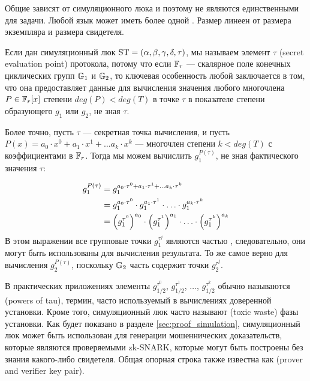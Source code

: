 Общие  зависят от симуляционного люка и поэтому не являются единственными для задачи. Любой язык может иметь более одной . Размер  линеен от размера экземпляра и размера свидетеля.

Если дан симуляционный люк $\mathrm{ST} = (\alpha,\beta,\gamma,\delta, \tau)$, мы называем элемент $\tau$  (secret evaluation point) протокола, потому что если $\mathbb{F}_r$ --- скалярное поле конечных циклических групп $\mathbb{G}_1$ и $\mathbb{G}_2$, то ключевая особенность любой  заключается в том, что она предоставляет данные для вычисления значения любого многочлена $P\in \mathbb{F}_r[x]$ степени $deg(P)<deg(T)$ в точке $\tau$ в показателе степени образующего $g_1$ или $g_2$, не зная $\tau$.

Более точно, пусть $\tau$ --- секретная точка вычисления, и пусть $P(x)=a_0\cdot x^0 + a_1\cdot x^1 + \ldots a_k\cdot x^k$ --- многочлен степени $k<deg(T)$ с коэффициентами в $\mathbb{F}_r$. Тогда мы можем вычислить $g_1^{P(\tau)}$, не зная фактического значения $\tau$:

\label{eq:exp_evaluation-poly}
\begin{align}
g_1^{P(\tau)} & = g_1^{a_0\cdot \tau^0 + a_1\cdot \tau^1 + \ldots a_k\cdot \tau^k} \notag\\
 & = g_1^{a_0\cdot \tau^0} \cdot g_1^{a_1\cdot \tau^1} \cdot \ldots \cdot g_1^{a_k\cdot \tau^k}\notag\\
 & = \Big(g_1^{\tau^0}\Big)^{a_0} \cdot \Big(g_1^{\tau^1}\Big)^{a_1} \cdot \ldots \cdot \Big(g_1^{\tau^k}\Big)^{a_k}
\end{align}
В этом выражении все групповые точки $g_1^{\tau^j}$ являются частью , следовательно, они могут быть использованы для вычисления результата. То же самое верно для вычисления $g_2^{P(\tau)}$, поскольку $\mathbb{G}_2$ часть  содержит точки $g_2^{\tau^j}$.

В практических приложениях элементы $g_{1/2}^{\tau^0}$, $g_{1/2}^{\tau^1}$, $\ldots$, $g_{1/2}^{\tau^k}$ обычно называются  (powers of tau), термин, часто используемый в вычислениях доверенной установки. Кроме того, симуляционный люк часто называют  (toxic waste) фазы установки. Как будет показано в разделе \ref{sec:proof_simulation}, симуляционный люк может быть использован для генерации мошеннических доказательств, которые являются проверяемыми zk-SNARK, которые могут быть построены без знания какого-либо свидетеля. Общая опорная строка также известна как  (prover and verifier key pair).

